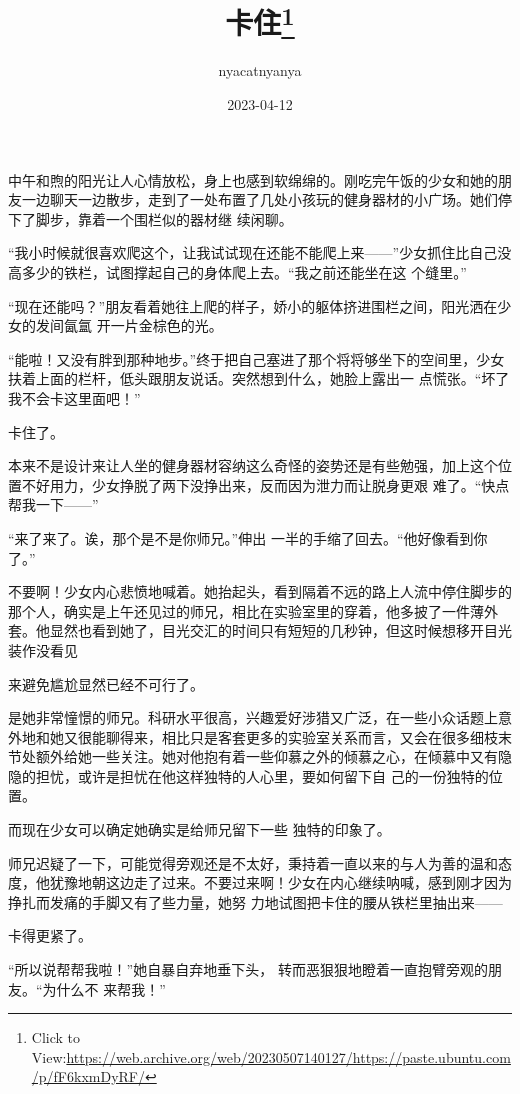 \documentclass{article}
\title{卡住\footnote{Click to View:\url{https://web.archive.org/web/20230507140127/https://paste.ubuntu.com/p/fF6kxmDyRF/}}}
\author{nyacatnyanya}
\date{2023-04-12}
\begin{document}

\maketitle


\Large

﻿中午和煦的阳光让人心情放松，身上也感到软绵绵的。刚吃完午饭的少女和她的朋友一边聊天一边散步，走到了一处布置了几处小孩玩的健身器材的小广场。她们停下了脚步，靠着一个围栏似的器材继
续闲聊。 

“我小时候就很喜欢爬这个，让我试试现在还能不能爬上来——”少女抓住比自己没高多少的铁栏，试图撑起自己的身体爬上去。“我之前还能坐在这
个缝里。” 

“现在还能吗？”朋友看着她往上爬的样子，娇小的躯体挤进围栏之间，阳光洒在少女的发间氤氲
开一片金棕色的光。 

\newpage

“能啦！又没有胖到那种地步。”终于把自己塞进了那个将将够坐下的空间里，少女扶着上面的栏杆，低头跟朋友说话。突然想到什么，她脸上露出一
点慌张。“坏了我不会卡这里面吧！” 


卡住了。 

本来不是设计来让人坐的健身器材容纳这么奇怪的姿势还是有些勉强，加上这个位置不好用力，少女挣脱了两下没挣出来，反而因为泄力而让脱身更艰
难了。“快点帮我一下——” 

“来了来了。诶，那个是不是你师兄。”伸出
一半的手缩了回去。“他好像看到你了。” 

不要啊！少女内心悲愤地喊着。她抬起头，看到隔着不远的路上人流中停住脚步的那个人，确实是上午还见过的师兄，相比在实验室里的穿着，他多披了一件薄外套。他显然也看到她了，目光交汇的时间只有短短的几秒钟，但这时候想移开目光装作没看见

\newpage
来避免尴尬显然已经不可行了。 

是她非常憧憬的师兄。科研水平很高，兴趣爱好涉猎又广泛，在一些小众话题上意外地和她又很能聊得来，相比只是客套更多的实验室关系而言，又会在很多细枝末节处额外给她一些关注。她对他抱有着一些仰慕之外的倾慕之心，在倾慕中又有隐隐的担忧，或许是担忧在他这样独特的人心里，要如何留下自
己的一份独特的位置。 

而现在少女可以确定她确实是给师兄留下一些
独特的印象了。 

师兄迟疑了一下，可能觉得旁观还是不太好，秉持着一直以来的与人为善的温和态度，他犹豫地朝这边走了过来。不要过来啊！少女在内心继续呐喊，感到刚才因为挣扎而发痛的手脚又有了些力量，她努
力地试图把卡住的腰从铁栏里抽出来—— 


卡得更紧了。 

“所以说帮帮我啦！”她自暴自弃地垂下头，
\newpage
转而恶狠狠地瞪着一直抱臂旁观的朋友。“为什么不
来帮我！” 
\end{document}
